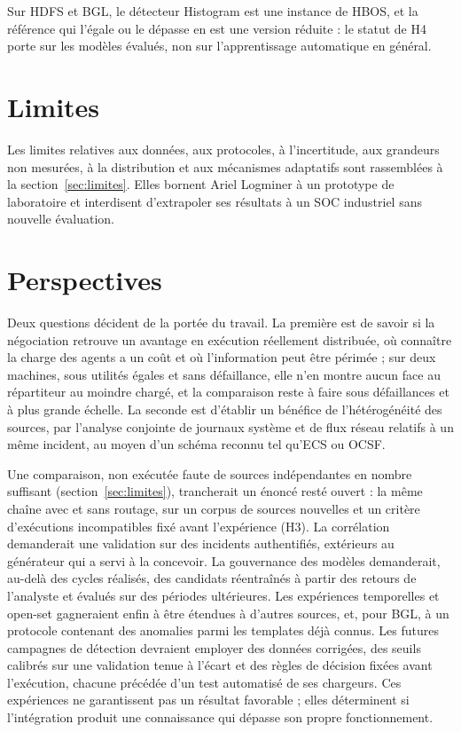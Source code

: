 Sur HDFS et BGL, le détecteur Histogram est une instance de HBOS, et la référence qui l'égale ou le dépasse en est une version réduite : le statut de H4 porte sur les modèles évalués, non sur l'apprentissage automatique en général.


\section*{Limites}

Les limites relatives aux données, aux protocoles, à l'incertitude, aux grandeurs non mesurées, à la distribution et aux mécanismes adaptatifs sont rassemblées à la section~\ref{sec:limites}. Elles bornent Ariel Logminer à un prototype de laboratoire et interdisent d'extrapoler ses résultats à un SOC industriel sans nouvelle évaluation.


\section*{Perspectives}

Deux questions décident de la portée du travail. La première est de savoir si la négociation retrouve un avantage en exécution réellement distribuée, où connaître la charge des agents a un coût et où l'information peut être périmée ; sur deux machines, sous utilités égales et sans défaillance, elle n'en montre aucun face au répartiteur au moindre chargé, et la comparaison reste à faire sous défaillances et à plus grande échelle. La seconde est d'établir un bénéfice de l'hétérogénéité des sources, par l'analyse conjointe de journaux système et de flux réseau relatifs à un même incident, au moyen d'un schéma reconnu tel qu'ECS ou OCSF.

Une comparaison, non exécutée faute de sources indépendantes en nombre suffisant (section~\ref{sec:limites}), trancherait un énoncé resté ouvert : la même chaîne avec et sans routage, sur un corpus de sources nouvelles et un critère d'exécutions incompatibles fixé avant l'expérience (H3). La corrélation demanderait une validation sur des incidents authentifiés, extérieurs au générateur qui a servi à la concevoir. La gouvernance des modèles demanderait, au-delà des cycles réalisés, des candidats réentraînés à partir des retours de l'analyste et évalués sur des périodes ultérieures. Les expériences temporelles et open-set gagneraient enfin à être étendues à d'autres sources, et, pour BGL, à un protocole contenant des anomalies parmi les templates déjà connus. Les futures campagnes de détection devraient employer des données corrigées, des seuils calibrés sur une validation tenue à l'écart et des règles de décision fixées avant l'exécution, chacune précédée d'un test automatisé de ses chargeurs. Ces expériences ne garantissent pas un résultat favorable ; elles déterminent si l'intégration produit une connaissance qui dépasse son propre fonctionnement.

